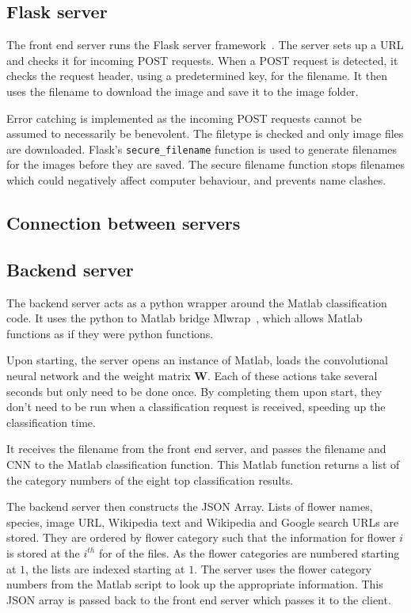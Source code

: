 \documentclass[11pt, a4paper]{report}
\newcommand{\vect}[1]{\boldsymbol{#1}}
\begin{document}
\subsection{Flask server}

The front end server runs the Flask server framework~\cite{Server:Flask}. The server sets up a URL and checks it for incoming POST requests. When a POST request is detected, it checks the request header, using a predetermined key, for the filename. It then uses the filename to download the image and save it to the image folder. 

Error catching is implemented as the incoming POST requests cannot be assumed to necessarily be benevolent. The filetype is checked and only image files are downloaded. Flask's \verb|secure_filename| function is used to generate filenames for the images before they are saved. The secure filename function stops filenames which could negatively affect computer behaviour, and prevents name clashes.

\subsection{Connection between servers}

\subsection{Backend server}

The backend server acts as a python wrapper around the Matlab classification code. It uses the python to Matlab bridge Mlwrap~\cite{Server:Mlwrap}, which allows Matlab functions as if they were python functions. 


Upon starting, the server opens an instance of Matlab, loads the convolutional neural network and the weight matrix $\vect{W}$. Each of these actions take several seconds but only need to be done once. By completing them upon start, they don't need to be run when a classification request is received, speeding up the classification time. 

It receives the filename from the front end server, and passes the filename and CNN to the Matlab classification function. This Matlab function returns a list of the category numbers of the eight top classification results. 

The backend server then constructs the JSON Array. Lists of flower names, species, image URL, Wikipedia text and Wikipedia and Google search URLs are stored. They are ordered by flower category such that the information for flower $i$ is stored at the $i^{th}$ for of the files. As the flower categories are numbered starting at $1$, the lists are indexed starting at $1$. The server uses the flower category numbers from the Matlab script to look up the appropriate information. This JSON array is passed back to the front end server which passes it to the client. 
\end{document}
